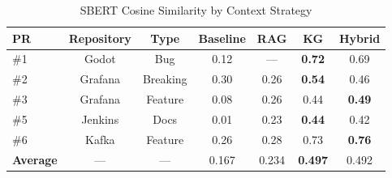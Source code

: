 \begin{table}[h]
\centering
\caption{SBERT Cosine Similarity by Context Strategy}
\label{tab:results}
\begin{tabular}{lcccccc}
\toprule
PR & Repository & Type & Baseline & RAG & KG & Hybrid \\
\midrule
\#1 & Godot & Bug & 0.12 & — & \textbf{0.72} & 0.69 \\
\#2 & Grafana & Breaking & 0.30 & 0.26 & \textbf{0.54} & 0.46 \\
\#3 & Grafana & Feature & 0.08 & 0.26 & 0.44 & \textbf{0.49} \\
\#5 & Jenkins & Docs & 0.01 & 0.23 & \textbf{0.44} & 0.42 \\
\#6 & Kafka & Feature & 0.26 & 0.28 & 0.73 & \textbf{0.76} \\
\midrule
\textbf{Average} & — & — & 0.167 & 0.234 & \textbf{0.497} & 0.492 \\
\bottomrule
\end{tabular}
\end{table}









